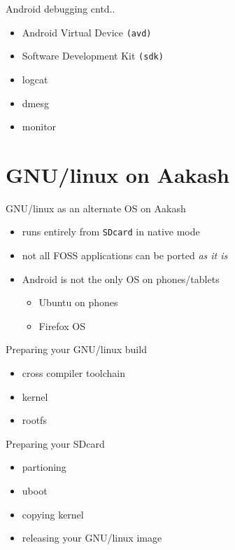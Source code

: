 \documentclass{beamer}
\begin{document}
\begin{frame}{Android debugging cntd..}
  \begin{block}{}
    \begin{itemize}
      \item Android Virtual Device {\tt (avd)}
      \item Software Development Kit {\tt (sdk)}
      \item logcat
      \item dmesg
      \item monitor
    \end{itemize}
  \end{block}
\end{frame}

\section{GNU/linux on Aakash}
\begin{frame}{GNU/linux as an alternate OS on Aakash}
  \begin{block}{}
    \begin{itemize}
      \item runs entirely from {\tt SDcard} in native mode
      \item not all FOSS applications can be ported {\em as it is}
      \item Android is not the only OS on phones/tablets \pause
        \begin{itemize}
        \item Ubuntu on phones
        \item Firefox OS
        \end{itemize}
    \end{itemize}
  \end{block}
\end{frame}

\begin{frame}{Preparing your GNU/linux build}
  \begin{block}{}
    \begin{itemize}
      \item cross compiler toolchain
      \item kernel
      \item rootfs
    \end{itemize}
  \end{block}

  \begin{block}{Preparing your SDcard}
    \begin{itemize}
      \item partioning
      \item uboot
      \item copying kernel
      \item releasing your GNU/linux image
    \end{itemize}
  \end{block}

\end{frame}
\end{document}
